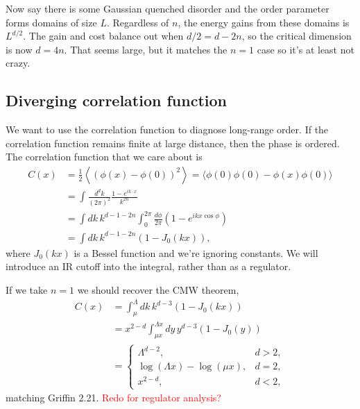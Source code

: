 \documentclass[12pt]{article}
\newcommand{\note}[1]{\textcolor{red}{#1}}
\newcommand{\ex}[1]{\left\langle#1\right\rangle}
\newcommand{\nn}{\nonumber\\}
\renewcommand{\th}[1]{\frac{1}{#1}}
\newcommand{\half}{\th{2}}
\newcommand{\IR}{\text{IR}}
\begin{document}
Now say there is some Gaussian quenched disorder and the order parameter forms domains of size $L$. Regardless of $n$, the energy gains from these domains is $L^{d/2}$.  The gain and cost balance out when $d/2 = d-2n$, so the critical dimension is now $d=4n$. That seems large, but it matches the $n=1$ case so it's at least not crazy.

\subsection{Diverging correlation function}

We want to use the correlation function to diagnose long-range order. If the correlation function remains finite at large distance, then the phase is ordered.
The correlation function that we care about is  
\begin{align}
C(x) &= \half \ex{(\phi(x)-\phi(0))^2} =  \langle\phi(0)\phi(0) - \phi(x)\phi(0)\rangle\nn
&= \int\frac{d^dk}{(2\pi)^2} \frac{1-e^{ik \cdot x}}{k^{2n}} \nn
&= \int dk\, k^{d-1-2n} \int_0^{2\pi} \frac{d\phi}{2\pi}(1 - e^{ikx \cos\phi} )\nn
&= \int dk\, k^{d-1-2n} (1 - J_0(kx)),
\end{align}
where $J_0(kx)$ is a Bessel function and we're ignoring constants. 
We will introduce an IR cutoff into the integral, rather than as a regulator.

If we take $n=1$ we should recover the CMW theorem,
\begin{align}
C(x) &= \int_\mu^\Lambda dk\, k^{d-3} (1 - J_0(kx)) \nn
&= x^{2-d} \int_{\mu x}^{\Lambda x} dy\, y^{d-3} (1 - J_0(y)) \nn
&= \begin{cases}
\Lambda^{d-2}, & d>2,\\
\log(\Lambda x) - \log(\mu x), & d=2,\\
x^{2-d}, & d<2,
\end{cases}
\end{align}
matching Griffin 2.21. \note{Redo for regulator analysis?}
\end{document}
